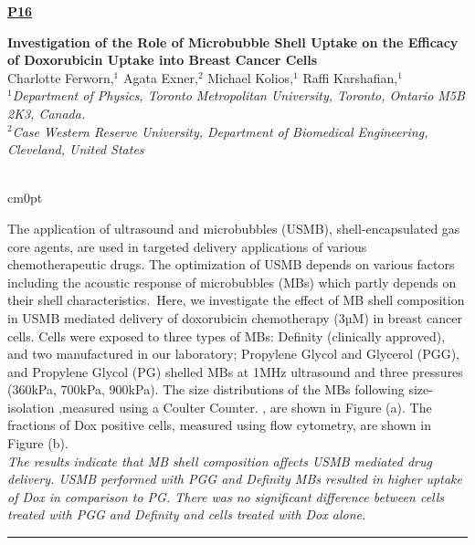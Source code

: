 \documentclass[titlepage,oneside,openany,10pt]{book}
\newenvironment{posterabswfig}[7] %
        {
	\FPeval{\cutw}{clip(16.7-#6)}
	\FPeval{\cutl}{round(#7/0.35+1,3)}
	\begin{flushright}
                \underline{\textbf{#4}}
        \end{flushright}
        \textbf{#1}\\%
        #2\\%
        \textit{#3}\\\\%
        \def\windowpagestuff{\centering
                \texttt{[image: \#5]}
	}
        \opencutright
        \begin{cutout}{0}{\cutw cm}{0pt}{\RoundingUpFunction{\cutl}}
        \noindent
	}
	{
	\end{cutout}
	\noindent\rule{15cm}{0.5pt}%
        }
\begin{document}
\newpage

\begin{posterabswfig}
	{Investigation of the Role of Microbubble Shell Uptake on the Efficacy of Doxorubicin Uptake into Breast Cancer Cells}
	{Charlotte Ferworn,$^{1}$ Agata Exner,$^{2}$ Michael Kolios,$^{1}$ Raffi Karshafian,$^{1}$}
	{
	$^1$Department of Physics, Toronto Metropolitan University, Toronto, Ontario M5B 2K3, Canada.\\
	$^2$Case Western Reserve University, Department of Biomedical Engineering, Cleveland, United States
	}
	{P16}
	{abstract_figures/Ferworn_Charlotte_Poster.png}
	{10.0}
	{4.0}
	The application of ultrasound and microbubbles (USMB), shell-encapsulated gas core agents, are used in targeted delivery applications of various chemotherapeutic drugs. The optimization of USMB depends on various factors including the acoustic response of microbubbles (MBs) which partly depends on their shell characteristics.~Here, we investigate the effect of MB shell composition in USMB mediated delivery of doxorubicin chemotherapy (3µM) in breast cancer cells. Cells were exposed to three types of MBs: Definity (clinically approved), and two manufactured in our laboratory; Propylene Glycol and Glycerol (PGG), and Propylene Glycol (PG) shelled MBs at 1MHz ultrasound and three pressures (360kPa, 700kPa, 900kPa). The size distributions of the MBs following size-isolation ,measured using a Coulter Counter. , are shown in Figure (a). The fractions of Dox positive cells, measured using flow cytometry, are shown in Figure (b).\\\emph{The results indicate that MB shell composition affects USMB mediated drug delivery. USMB performed with PGG and Definity MBs resulted in higher uptake of Dox in comparison to PG. There was no significant difference between cells treated with PGG and Definity and cells treated with Dox alone.}
	\label{FerwornC}
\end{posterabswfig}

\newpage
\end{document}
